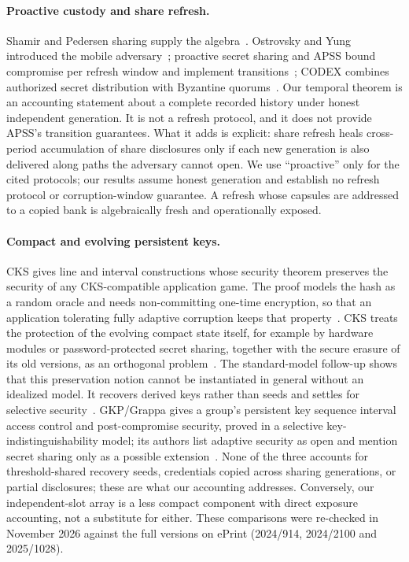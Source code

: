 \documentclass[pdflatex,sn-mathphys-num,twocolumn]{sn-jnl}
\theoremstyle{plain}
\theoremstyle{definition}
\begin{document}
\paragraph{Proactive custody and share refresh.}
Shamir and Pedersen sharing supply the algebra~\cite{shamir1979,pedersen1991}. Ostrovsky and Yung introduced the mobile adversary~\cite{ostrovsky1991}; proactive secret sharing and APSS bound compromise per refresh window and implement transitions~\cite{herzberg1995,zhou2005}; CODEX combines authorized secret distribution with Byzantine quorums~\cite{marsh2004}. Our temporal theorem is an accounting statement about a complete recorded history under honest independent generation. It is not a refresh protocol, and it does not provide APSS's transition guarantees. What it adds is explicit: share refresh heals cross-period accumulation of share disclosures only if each new generation is also delivered along paths the adversary cannot open. We use ``proactive'' only for the cited protocols; our results assume honest generation and establish no refresh protocol or corruption-window guarantee. A refresh whose capsules are addressed to a copied bank is algebraically fresh and operationally exposed.

\paragraph{Compact and evolving persistent keys.}
CKS gives line and interval constructions whose security theorem preserves the security of any CKS-compatible application game. The proof models the hash as a random oracle and needs non-committing one-time encryption, so that an application tolerating fully adaptive corruption keeps that property~\cite[Thm.~3]{dodis2024}. CKS treats the protection of the evolving compact state itself, for example by hardware modules or password-protected secret sharing, together with the secure erasure of its old versions, as an orthogonal problem~\cite[Sect.~1]{dodis2024}. The standard-model follow-up shows that this preservation notion cannot be instantiated in general without an idealized model. It recovers derived keys rather than seeds and settles for selective security~\cite[Sects.~1.1 and~2.3]{dodisstandard2024}. GKP/Grappa gives a group's persistent key sequence interval access control and post-compromise security, proved in a selective key-indistinguishability model; its authors list adaptive security as open and mention secret sharing only as a possible extension~\cite[Sects.~1 and~7.1]{backendal2026}. None of the three accounts for threshold-shared recovery seeds, credentials copied across sharing generations, or partial disclosures; these are what our accounting addresses. Conversely, our independent-slot array is a less compact component with direct exposure accounting, not a substitute for either. These comparisons were re-checked in November 2026 against the full versions on ePrint (2024/914, 2024/2100 and 2025/1028).
\end{document}
